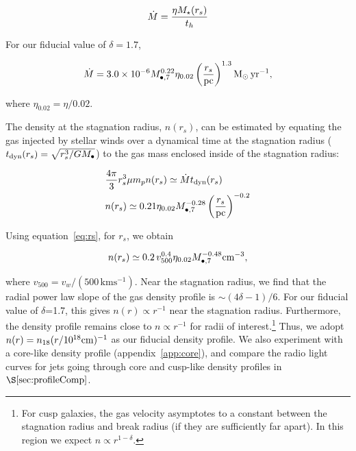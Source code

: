 \documentclass[usenatbib,fleqn]{mnras}
\newcommand{\Mbh}[1][]{M_{\bullet#1}}
\newcommand{\Msun}{{\rm M_\odot}}
\newcommand{\rs}{r_s}
\begin{document}
\begin{equation}
\dot{M}=\frac{\eta M_{\rm \star}(\rs)}{t_h}
\label{eq:dotM}
\end{equation}

\noindent For our fiducial value of $\delta=1.7$,

\begin{equation}
\dot{M}= 3.0 \times 10^{-6} \Mbh[,7]^{0.22} \eta_{0.02} \left(\frac{r_s}{\rm
  pc}\right)^{1.3} \Msun \, {\rm yr}^{-1},
\end{equation}


\noindent where $\eta_{0.02}=\eta/0.02$. 

The density at the stagnation radius, $n(\rs)$, can be estimated by
equating the gas injected by stellar winds over a dynamical time at
the stagnation radius ($t_{\rm dyn} (\rs)=\sqrt{\rs^3/G \Mbh}$) to the
gas mass enclosed inside of the stagnation radius:

\begin{align}
  &\frac{4 \pi}{3} \rs^3 \mu m_p n(r_s) \simeq \dot{M} t_{\rm dyn}
  (\rs) \nonumber\\
  &n(r_s) \simeq 0.21 \eta_{0.02} \Mbh[,7]^{-0.28} \left(\frac{r_s}{\rm
      pc}\right)^{-0.2}
\label{eq:nrs}
\end{align}
 
\noindent Using equation~\eqref{eq:rs}, for $r_s$, we obtain 

\begin{equation}
n(r_s) \simeq 0.2 \, v_{500}^{0.4} \eta_{0.02} \Mbh[,7]^{-0.48} {\rm cm}^{-3},
\label{eq:nrs2}
\end{equation}

\noindent where $v_{500}=v_w/\left(500 \,\mathrm{km
    s^{-1}}\right)$. Near the stagnation radius, we find
that the radial power law slope of the gas density profile is $\sim
(4\delta-1)/6$. For our fiducial value of $\delta$=1.7, this gives
$n(r)\propto r^{-1}$ near the stagnation radius. Furthermore, the
density profile remains close to $n\propto r^{-1}$ for radii of
interest.\footnote{For cusp galaxies, the gas velocity asymptotes to a
  constant between the stagnation radius and break radius (if they are
  sufficiently far apart). In this region we expect $n\propto
  r^{1-\delta}$.}  Thus, we adopt $n(r)= n_{18} (r/10^{18} {\rm
  cm})^{-1}$ as our fiducial density profile.  We also experiment with
a core-like density profile (appendix~\ref{app:core}), and compare the
radio light curves for jets going through core and cusp-like density
profiles in $\S\ref{sec:profileComp}$.
\end{document}
